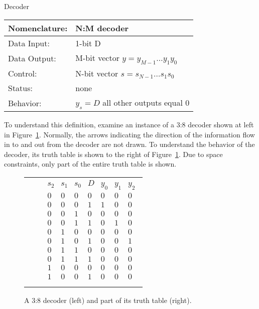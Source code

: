 \begin{buildingblock}{Decoder}
\label{buildingblock:decoder}
\begin{tabular}{|l|p{3.5in}|} \hline
Nomenclature:  & N:M decoder				\\ \hline
Data Input:    & 1-bit D		\\ \hline
Data Output:   & M-bit vector $y = y_{M-1} \ldots y_1 y_0$	\\ \hline
Control:       & N-bit vector $s = s_{N-1} \ldots s_1 s_0$	\\ \hline
Status:        & none					\\ \hline
Behavior:      & $y_s = D$ all other outputs equal 0	\\ \hline
\end{tabular}
\label{page:dec}
\end{buildingblock}

To understand this definition, examine an
instance of a 3:8 decoder shown at left in Figure~\ref{fig:comboBB3:8}.
Normally, the arrows indicating the direction of the information 
flow in to and out from the decoder are not drawn.  
To understand the behavior of the decoder, its
truth table is shown to the right of Figure~\ref{fig:comboBB3:8}. 
Due to space constraints, only part of the entire truth
table is shown.

\begin{figure}[ht]
\begin{tabular}[b]{p{1.0in}p{0.5in}l}
\includegraphics[0mm,20mm][12mm,12mm]{3_8} & &
$\begin{array}{c|c|c|c||c|c|c}
s_2 & s_1 & s_0 & D & y_0 & y_1 & y_2\\ \hline
0 & 0 & 0 & 0 	& 0  &   0 &   0\\ \hline
0 & 0 & 0 & 1 	& 1  &   0 &   0\\ \hline
0 & 0 & 1 & 0 	& 0  &   0 &   0\\ \hline
0 & 0 & 1 & 1 	& 0  &   1 &   0\\ \hline
0 & 1 & 0 & 0 	& 0  &   0 &   0\\ \hline
0 & 1 & 0 & 1 	& 0  &   0 &   1\\ \hline
0 & 1 & 1 & 0 	& 0  &   0 &   0\\ \hline
0 & 1 & 1 & 1 	& 0  &   0 &   0\\ \hline
1 & 0 & 0 & 0 	& 0  &   0 &   0\\ \hline
1 & 0 & 0 & 1 	& 0  &   0 &   0\\
\end{array}$ \\
\end{tabular}
\caption{A 3:8 decoder (left) and part of its truth table (right).}
\label{fig:comboBB3:8}
\end{figure}

